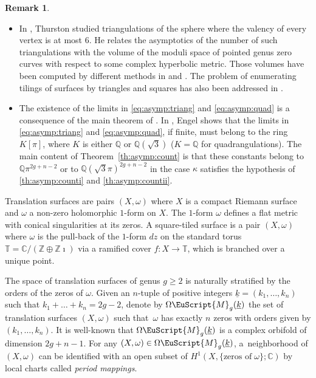 \documentclass[JEP,XML,SOM,Unicode]{cedram}
\let\mathcal\EuScript
\theoremstyle{plain}
\theoremstyle{definition}
\newtheorem{Remark}[Theorem]{Remark}
\def\C{\mathbb{C}}
\newcommand\Z{\mathbb{Z}}
\newcommand{\Q}{\mathbb{Q}}
\newcommand{\Tbb}{\mathbb{T}}
\newcommand{\Mcal}{\mathcal{M}}
\let\omg\omega
\let\ul\underline
\newcommand{\trate}{\Omega\Mcal_{g}(\ul{k})}
\begin{document}
\skpt
\begin{Remark}\label{rk:limit:known}
\begin{itemize}
\item
In \cite{Thurston98}, Thurston studied triangulations of the sphere where the valency of every vertex is at most $6$.
He relates the asymptotics of the number of such triangulations with the volume of the moduli space of pointed genus zero curves with respect to some complex hyperbolic metric. Those volumes have been computed by different methods in \cite{McMullen17} and \cite{KN18}.
The problem of enumerating tilings of surfaces by triangles and squares has also been addressed in \cite{ES18,Engel-I,Engel-II}.

\item The existence of the limits in \eqref{eq:asymp:triang} and \eqref{eq:asymp:quad} is a consequence of the main theorem of \cite{Ngu19}. In \cite{Engel-I}, Engel shows that the limits in \eqref{eq:asymp:triang} and \eqref{eq:asymp:quad}, if finite, must belong to the ring $K[\pi]$, where $K$ is either $\Q$ or $\Q(\sqrt{3})$ ($K=\Q$ for quadrangulations). The main content of Theorem~\ref{th:asymp:count} is that these constants belong to $\Q\pi^{2g+n-2}$ or to $\Q(\sqrt{3}\pi)^{2g+n-2}$ in the case $\kappa$ satisfies the hypothesis of \eqref{th:asymp:counti} and \eqref{th:asymp:countii}.
\end{itemize}
\end{Remark}

\label{sec:enum:sq:tiled}
Translation surfaces are pairs $(X,\omega)$ where $X$ is a compact Riemann surface and $\omega$ a non-zero holomorphic $1$-form on $X$. The $1$-form $\omg$ defines a flat metric with conical singularities at its zeros.
A square-tiled surface is a pair $(X,\omega)$ where $\omega$ is the pull-back of the $1$-form $dz$ on the standard torus $\Tbb=\C/(\Z\oplus\Z\imath)$ via a ramified cover $f: X\to \Tbb$, which is branched over a unique point.

The space of translation surfaces of genus $g\geq 2$ is naturally stratified by the orders of the zeros of $\omega$. Given an $n$-tuple of positive integers $\ul{k}=(k_1,\dots,k_n)$ such that \hbox{$k_1+\dots+k_n=2g-2$}, denote by $\trate$ the set of translation surfaces $(X,\omega)$ such that~$\omega$ has exactly $n$ zeros with orders given by $(k_1,\dots,k_n)$.
It is well-known that $\trate$ is a complex orbifold of dimension $2g+n-1$. For any $(X,\omega)\in \trate$, a~neighborhood of $(X,\omega)$ can be identified with an open subset of $H^1(X,\{\textrm{zeros of} \; \omega\}; \C)$ by local charts called \emph{period mappings}.
\end{document}
